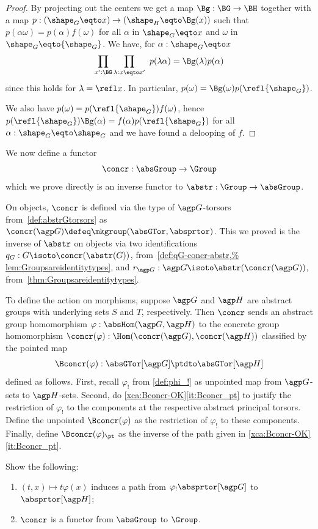 \begin{proof}
 By projecting out the centers we get a map $\Bg:\BG\rightarrow \BH$
 together with a map $p:({\sh_G}\eqto x)\rightarrow ({\sh_H} \eqto \Bg(x))$ 
 such that $p (\alpha\omega) = p(\alpha) f(\omega)$
 for all $\alpha$ in $\sh_G \eqto x$ and $\omega$ in $\sh_G \eqto {\sh_G}$.
We have, for $\alpha:\sh_G \eqto x$
$$\prod_{x':\BG}\prod_{\lambda:x\eqto x'}~p(\lambda\alpha) = \Bg(\lambda)p(\alpha)$$
since this holds for $\lambda = \refl x$.
In particular, $p(\omega) = \Bg(\omega)p(\refl{\sh_G})$.

We also have $p(\omega) = p(\refl{\sh_G})f(\omega)$, hence
$p(\refl{\sh_G})\Bg(\alpha) =  f(\alpha)p(\refl{\sh_G})$
for all $\alpha:\sh_G\eqto \sh_G$ and we have found a delooping of $f$.
\end{proof}


We now define a functor
\[
  \concr : \absGroup \to \Group
\]
which we prove directly is an inverse functor
to $\abstr : \Group \to \absGroup$.

On objects, $\concr$ is defined
via the type of $\agp G$-torsors from~\cref{def:abstrGtorsors}
as $\concr(\agp G) \defeq \mkgroup(\absGTor, \absprtor)$.
This we proved is the inverse
of $\abstr$ on objects via two identifications
$q_G : G \isoto \concr(\abstr(G))$, from~\cref{def:qG-concr-abstr,%
  lem:Groupsareidentitytypes},
and $r_{\agp G} : \agp G \isoto \abstr(\concr(\agp G))$,
from~\cref{thm:Groupsareidentitytypes}.

To define the action on morphisms, suppose $\agp G$ and $\agp H$
are abstract groups with underlying sets $S$ and $T$, respectively.
Then $\concr$ sends an abstract group homomorphism
$\varphi : \absHom(\agp G, \agp H)$ to the concrete group homomorphism
$\concr(\varphi):\Hom(\concr(\agp G),\concr(\agp H))$
classified by the pointed map
\[
  \Bconcr(\varphi) : \absGTor[\agp G] \ptdto \absGTor[\agp H]
\]
defined as follows.  First, recall $\varphi_!$ from \cref{def:phi_!}
as unpointed map from $\agp G$-sets to $\agp H$-sets. Second, do 
\cref{xca:Bconcr-OK}\ref{it:Bconcr_pt} to justify the restriction of $\varphi_!$
to the components at the respective abstract principal torsors.
Define the unpointed $\Bconcr(\varphi)$ as the restriction of $\varphi_!$
to these components. Finally, define $\Bconcr(\varphi)_\pt$ as the
inverse of the path given in \cref{xca:Bconcr-OK}\ref{it:Bconcr_pt}. 

\begin{xca}\label{xca:Bconcr-OK}
Show the following:
\begin{enumerate}
\item\label{it:Bconcr_pt} $(t,x)\mapsto t\varphi(x)$ induces a path from
$\varphi_!\absprtor[\agp G]$ to $\absprtor[\agp H]$;
\item $\concr$ is a functor from $\absGroup$ to $\Group$.\qedhere
\end{enumerate}
\end{xca}

